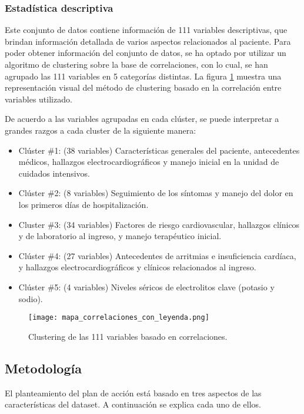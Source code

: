 \documentclass[conference]{IEEEtran}
\begin{document}
\subsubsection{Estadística descriptiva}\label{edes}
Este conjunto de datos contiene información de 111 variables descriptivas, que brindan información detallada de varios aspectos relacionados al paciente. Para poder obtener información del conjunto de datos, se ha optado por utilizar un algoritmo de clustering sobre la base de correlaciones, con lo cual, se han agrupado las 111 variables en 5 categorías distintas. La figura \ref{fig:fig1} muestra una representación visual del método de clustering basado en la correlación entre variables utilizado.

De acuerdo a las variables agrupadas en cada clúster, se puede interpretar a grandes razgos a cada cluster de la siguiente manera:

\begin{itemize}
    \item Clúster \#1: (38 variables) Características generales del paciente, antecedentes médicos, hallazgos electrocardiográficos y manejo inicial en la unidad de cuidados intensivos.
    \item Clúster \#2: (8 variables) Seguimiento de los síntomas y manejo del dolor en los primeros días de hospitalización.
    \item Cluster \#3: (34 variables) Factores de riesgo cardiovascular, hallazgos clínicos y de laboratorio al ingreso, y manejo terapéutico inicial. 
    \item Clúster \#4: (27 variables) Antecedentes de arritmias e insuficiencia cardíaca, y hallazgos electrocardiográficos y clínicos relacionados al ingreso.
    \item Clúster \#5: (4 variables) Niveles séricos de electrolitos clave (potasio y sodio).
\end{itemize}

\begin{figure}[htbp!]
  \centering
  \texttt{[image: mapa\_correlaciones\_con\_leyenda.png]} 
  \caption{Clustering de las 111 variables basado en correlaciones.}
  \label{fig:fig1}
\end{figure}

\subsection{Metodología}
El planteamiento del plan de acción está basado en tres aspectos de las características del dataset. A continuación se explica cada uno de ellos. 
\end{document}
